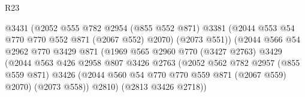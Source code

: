 \begin{lexlean}{R23}
\begin{coremodule}
                                          @3431
                                          (@2052
                                            @555
                                            @782
                                            @2954
                                            (@855 @552 @871)
                                            @3381
                                            (@2044 @553 @54 @770 @770 @552 @871 (@2067 @552) @2070)
                                            (@2073 @551))
                                          (@2044
                                            @566
                                            @54
                                            @2962
                                            @770
                                            @3429
                                            @871
                                            (@1969
                                              @565
                                              @2960
                                              @770
                                              (@3427 @2763)
                                              @3429
                                              (@2044
                                                @563
                                                @426
                                                @2958
                                                @807
                                                @3426
                                                @2763
                                                (@2052
                                                  @562
                                                  @782
                                                  @2957
                                                  (@855 @559 @871)
                                                  @3426
                                                  (@2044
                                                    @560
                                                    @54
                                                    @770
                                                    @770
                                                    @559
                                                    @871
                                                    (@2067 @559)
                                                    @2070)
                                                  (@2073 @558))
                                                @2810)
                                              (@2813 @3426 @2718))

\end{coremodule}
\end{lexlean}
